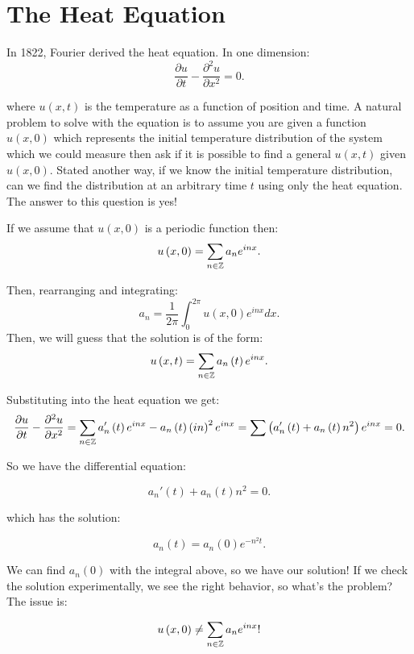 
\section{The Heat Equation}

In 1822, Fourier derived the heat equation. In one dimension: 
\[
	\frac{\partial u}{\partial t} - \frac{\partial^{2} u}{\partial x^{2}} = 0
.\] 

where $u\left( x, t \right) $ is the temperature as a function of position and time. A natural problem to solve with the equation is to assume you are given a function $u\left( x, 0 \right) $ which represents the initial temperature distribution of the system which we could measure then ask if it is possible to find a general $u\left( x, t \right) $ given $u\left( x, 0 \right) $. Stated another way, if we know the initial temperature distribution, can we find the distribution at an arbitrary time $t$ using only the heat equation. The answer to this question is yes!

If we assume that $u\left( x, 0 \right)$ is a periodic function then:
\[
	u\left( x, 0 \right) = \sum_{n \in \mathbb{Z}} a_n e^{inx}
.\]

Then, rearranging and integrating: 
\[
	a_n = \frac{1}{2\pi} \int_0^{2\pi} u\left( x, 0 \right) e^{inx} dx
.\] 
Then, we will guess that the solution is of the form:
\[
	u\left( x, t \right) = \sum_{n \in \mathbb{Z}} a_n\left( t \right)  e^{inx}
.\]
 
Substituting into the heat equation we get:
\[
	\frac{\partial u}{\partial t} - \frac{\partial^{2} u}{\partial x^{2}} = \sum_{n \in \mathbb{Z}} a_n'\left( t \right)  e^{inx} -  a_n\left( t \right) \left( in \right)^{2}  e^{inx} = \sum \left( a_n'\left( t \right) + a_n\left( t \right) n^{2}  \right) e^{inx} = 0  
.\]

So we have the differential equation:

\[
a_n'\left( t \right) + a_n\left( t \right) n^{2} = 0
.\]

which has the solution:

\[
a_n\left( t \right) = a_n\left( 0 \right) e^{-n^{2}t}
.\] 

We can find $a_n\left( 0 \right) $ with the integral above, so we have our solution! If we check the solution experimentally, we see the right behavior, so what's the problem? The issue is:

\[
	u\left( x, 0 \right) \neq \sum_{n \in \mathbb{Z}} a_n e^{inx}	
!\] 

